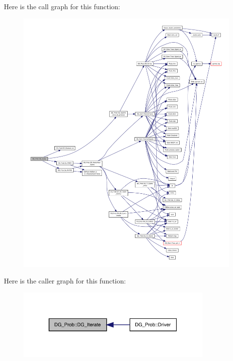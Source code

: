 Here is the call graph for this function\+:
\nopagebreak
\begin{figure}[H]
\begin{center}
\leavevmode
\includegraphics[width=350pt]{classDG__Prob_ac4dfaa4ea6466833ecb5cc5c3fcb3875_cgraph}
\end{center}
\end{figure}
Here is the caller graph for this function\+:
\nopagebreak
\begin{figure}[H]
\begin{center}
\leavevmode
\includegraphics[width=277pt]{classDG__Prob_ac4dfaa4ea6466833ecb5cc5c3fcb3875_icgraph}
\end{center}
\end{figure}
\mbox{\label{classDG__Prob_af49f46574209aa53e1f2b3529f6a09fb}} 
